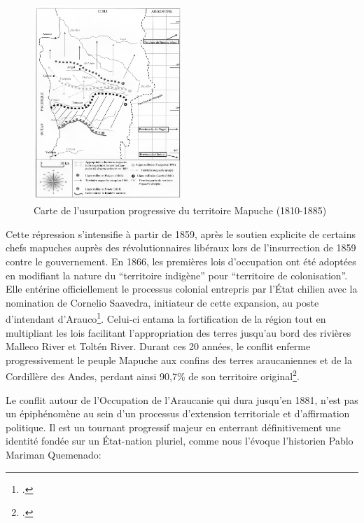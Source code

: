 	\begin{figure}[h!]
	    \centering
	    \includegraphics[width= 0.5\textwidth]{annexes/carte/carte_expansion.png}
	    \caption{Carte de l’usurpation progressive du territoire Mapuche (1810-1885)\protect\footnotemark}
	    \label{fig:my_label}
	\end{figure}
	
	Cette répression s'intensifie à partir de 1859, après le soutien explicite de certains chefs mapuches auprès des révolutionnaires libéraux lors de l'insurrection de 1859 contre le gouvernement. En 1866, les premières lois d'occupation ont été adoptées en modifiant la nature du \enquote{territoire indigène} pour  \enquote{territoire de colonisation}. Elle entérine officiellement le processus colonial entrepris par l'État chilien avec la nomination de Cornelio Saavedra, initiateur de cette expansion, au poste d'intendant d'Arauco\footcite[p~.314]{bengoaMemoriaOlvidadaHistoria2004}. Celui-ci entama la fortification de la région tout en multipliant les lois facilitant l'appropriation des terres jusqu'au bord des rivières Malleco River et Toltén River. Durant ces 20 années, le conflit enferme progressivement le peuple Mapuche aux confins des terres araucaniennes et de la Cordillère des Andes, perdant ainsi 90,7\% de son territoire original\footcite[p~.350]{bengoaMemoriaOlvidadaHistoria2004}.
	
	Le conflit autour de l'Occupation de l'Araucanie qui dura jusqu'en 1881, n'est pas un épiphénomène au sein d'un processus d'extension territoriale et d'affirmation politique. Il est un tournant progressif majeur en enterrant définitivement une identité fondée sur un État-nation pluriel, comme nous l'évoque l'historien Pablo Mariman Quemenado: 
	

